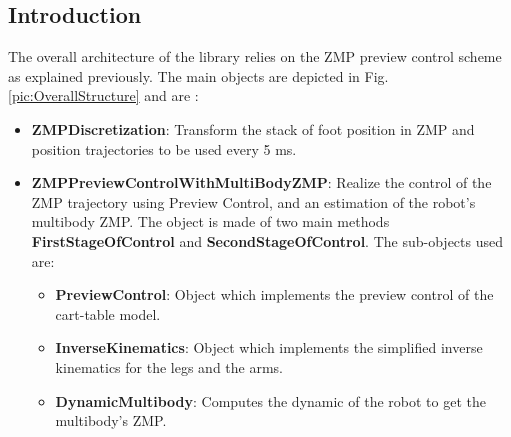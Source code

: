 \subsection{Introduction}
The overall architecture of the library relies on the ZMP preview control scheme as explained previously.
The main objects are depicted in Fig. \ref{pic:OverallStructure} and are :
\begin{itemize}
\item {\bf ZMPDiscretization}: Transform the stack of foot position in ZMP and position trajectories to be used
every 5 ms.
\item {\bf ZMPPreviewControlWithMultiBodyZMP}: Realize the control of the ZMP trajectory using Preview Control, and 
an estimation of the robot's multibody ZMP. The object is made of two main methods {\bf FirstStageOfControl} and {\bf SecondStageOfControl}.
The sub-objects used are:
\begin{itemize}
\item {\bf PreviewControl}: Object which implements the preview control of the cart-table model.
\item {\bf InverseKinematics}: Object which implements the simplified inverse kinematics for the legs and the arms.
\item {\bf DynamicMultibody}: Computes the dynamic of the robot to get the multibody's ZMP.
\end{itemize}
\end{itemize}

